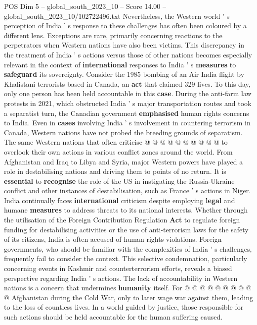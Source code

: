 \begin{textsample}{POS Dim 5 – global\_south\_2023\_10 – Score 14.00 – global\_south\_2023\_10/102722496.txt}
Nevertheless, the Western world ' s perception of India ' s response to these challenges has often been coloured by a different lens.
Exceptions are rare, primarily concerning reactions to the perpetrators when Western nations have also been victims.
This discrepancy in the treatment of India ' s actions versus those of other nations becomes especially relevant in the context of \textbf{international} responses to India ' s \textbf{measures} to \textbf{safeguard} its sovereignty.
Consider the 1985 bombing of an Air India flight by Khalistani terrorists based in Canada, an \textbf{act} that claimed 329 lives.
To this day, only one person has been held accountable in this \textbf{case}.
During the anti-farm law protests in 2021, which obstructed India ' s major transportation routes and took a separatist turn, the Canadian government \textbf{emphasised} human rights concerns to India.
Even in \textbf{cases} involving India ' s involvement in countering terrorism in Canada, Western nations have not probed the breeding grounds of separatism.
The same Western nations that often criticise @ @ @ @ @ @ @ @ @ @ to overlook their own actions in various conflict zones around the world.
From Afghanistan and Iraq to Libya and Syria, major Western powers have played a role in destabilising nations and driving them to points of no return.
It is \textbf{essential} to \textbf{recognise} the role of the US in instigating the Russia-Ukraine conflict and other instances of destabilisation, such as France ' s actions in Niger.
India continually faces \textbf{international} criticism despite employing \textbf{legal} and humane \textbf{measures} to address threats to its national interests.
Whether through the utilisation of the Foreign Contribution Regulation \textbf{Act} to regulate foreign funding for destabilising activities or the use of anti-terrorism laws for the safety of its citizens, India is often accused of human rights violations.
Foreign governments, who should be familiar with the complexities of India ' s challenges, frequently fail to consider the context.
This selective condemnation, particularly concerning events in Kashmir and counterterrorism efforts, reveals a biased perspective regarding India ' s actions.
The lack of accountability in Western nations is a concern that undermines \textbf{humanity} itself.
For @ @ @ @ @ @ @ @ @ @ Afghanistan during the Cold War, only to later wage war against them, leading to the loss of countless lives.
In a world guided by justice, those responsible for such actions should be held accountable for the human suffering caused.

\end{textsample}

